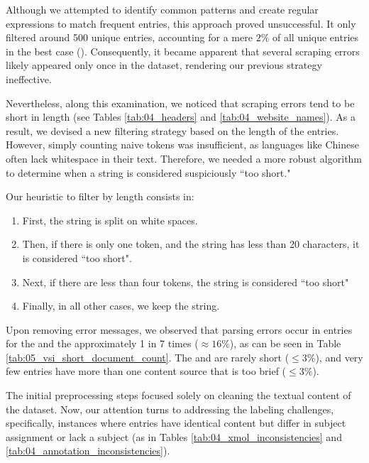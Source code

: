 Although we attempted to identify common patterns and create regular expressions to match frequent entries, this approach proved unsuccessful. It only filtered around 500 unique entries, accounting for a mere $2\%$ of all unique entries in the best case (\trafilaturaAbstract{}). Consequently, it became apparent that several scraping errors likely appeared only once in the dataset, rendering our previous strategy ineffective.

Nevertheless, along this examination, we noticed that scraping errors tend to be short in length (see Tables \ref{tab:04_headers} and \ref{tab:04_website_names}). As a result, we devised a new filtering strategy based on the length of the entries. However, simply counting naive tokens was insufficient, as languages like Chinese often lack whitespace in their text. Therefore, we needed a more robust algorithm to determine when a string is considered suspiciously ``too short."

Our heuristic to filter by length consists in:

\begin{enumerate}
    \item First, the string is split on white spaces.
    \item Then, if there is only one token, and the string has less than 20 characters, it is considered ``too short".
    \item Next, if there are less than four tokens, the string is considered ``too short"
    \item Finally, in all other cases, we keep the string.
\end{enumerate}




Upon removing error messages, we observed that parsing errors occur in entries for the \trafilaturaTitle{} and the \translationTitle{} approximately 1 in 7 times ($\approx 16\% $), as can be seen in Table \ref{tab:05_vsi_short_document_count}. The \trafilaturaAbstract{} and \trafilaturaFulltext{} are rarely short ($\leq 3\% $), and very few entries have more than one content source that is too brief ($\leq 3\% $).


\label{vsi_resolving_inconsistencies}

The initial preprocessing steps focused solely on cleaning the textual content of the dataset. Now, our attention turns to addressing the labeling challenges, specifically, instances where entries have identical content but differ in subject assignment or lack a subject (as in Tables \ref{tab:04_xmol_inconsistencies} and \ref{tab:04_annotation_inconsistencies}).


